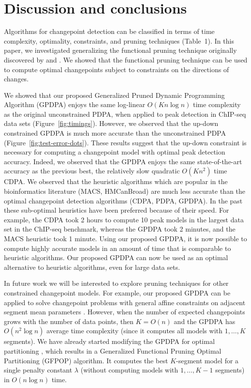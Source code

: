 \documentclass[aoas]{imsart}
\begin{document}
\section{Discussion and conclusions}
\label{sec:discussion}

Algorithms for changepoint detection can be classified in terms of
time complexity, optimality, constraints, and pruning techniques
(Table~1). In this paper, we investigated generalizing the functional
pruning technique originally discovered by \citet{pruned-dp} and
\citet{phd-johnson}. We showed that the functional pruning technique can
be used to compute optimal changepoints subject to constraints
on the directions of changes.

We showed that our proposed Generalized Pruned Dynamic Programming
Algorithm (GPDPA) enjoys the same log-linear $O(Kn\log n)$ time
complexity as the original unconstrained PDPA, when applied to peak
detection in ChIP-seq data sets (Figure~\ref{fig:timings}). However,
we observed that the up-down constrained GPDPA is much more accurate
than the unconstrained PDPA (Figure~\ref{fig:test-error-dots}). These
results suggest that the up-down constraint is necessary for computing
a changepoint model with optimal peak detection accuracy. Indeed, we
observed that the GPDPA enjoys the same state-of-the-art accuracy as
the previous best, the relatively slow quadratic $O(Kn^2)$ time
CDPA.
We observed that the heuristic algorithms which are popular in the
bioinformatics literature (MACS, HMCanBroad) are much less accurate
than the optimal changepoint detection algorithms (CDPA, PDPA,
GPDPA). In the past these sub-optimal heuristics have been preferred
because of their speed. For example, the CDPA took 2 hours to compute
10 peak models in the largest data set in the ChIP-seq benchmark,
whereas the GPDPA took 2 minutes, and the MACS heuristic took 1
minute. Using our proposed GPDPA, it is now possible to compute highly
accurate models in an amount of time that is comparable to heuristic
algorithms. Our proposed GPDPA can now be used as an optimal
alternative to heuristic algorithms, even for large data sets.

In future work we will be interested to explore pruning techniques for
other constrained changepoint models. For example, our proposed GPDPA can be
applied to solve changepoint problems with general affine constraints
on adjacent segment mean parameters
\citep{Hocking-constrained-changepoint-detection}. However, when the number of
expected changepoints grows with the number of data points, then
$K=O(n)$ and the GPDPA has $O(n^2 \log n)$ average time
complexity (since it computes all models with $1,\dots,K$
segments). We have already started modifying the GPDPA for optimal
partitioning \citep{optimal-partitioning}, which results in a
Generalized Functional Pruning Optimal Partitioning (GFPOP)
algorithm. It computes the best $K$-segment model for a single penalty
constant $\lambda$ (without computing models with $1,\dots,K-1$
segments) in $O(n\log n)$ time.
\end{document}
